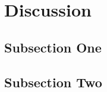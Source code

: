 \section{Discussion}

\subsection{Subsection One}

\lipsum[7] %

\subsection{Subsection Two}

\lipsum[8] %
